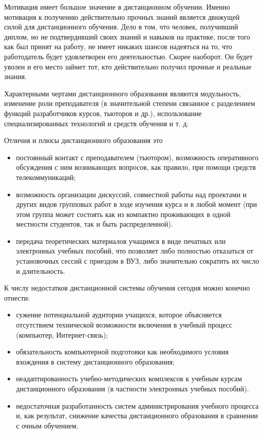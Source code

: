 Мотивация имеет большое значение в дистанционном обучении. Именно мотивация к получению действительно прочных знаний
является движущей силой для дистанционного обучения. Дело в том, что человек, получивший диплом,
но не подтвердивший своих знаний и навыков на практике, после того как был принят на работу,
не имеет никаких шансов надеяться на то, что работодатель будет удовлетворен его деятельностью.
Скорее наоборот. Он будет уволен и его место займет тот, кто действительно получил прочные и
реальные знания.

Характерными чертами дистанционного образования являются модульность, изменение роли
преподавателя (в значительной степени связанное с разделением функций разработчиков курсов,
тьюторов и др.), использование специализированных технологий и средств обучения и т. д.

Отличия и плюсы дистанционного образования это
\begin{itemize}[wide,topsep=0pt]
  \itemsep0em
  \item постоянный контакт с преподавателем (тьютором), возможность оперативного обсуждения с ним
  возникающих вопросов, как правило, при помощи средств телекоммуникаций;
  \item возможность организации дискуссий, совместной работы над проектами и других видов групповых
  работ в ходе изучения курса и в любой момент (при этом группа может состоять как
  из компактно проживающих в одной местности студентов, так и быть распределенной).
  \item передача теоретических материалов учащимся в виде печатных или электронных учебных пособий,
  что позволяет либо полностью отказаться от установочных сессий с приездом в ВУЗ, либо
  значительно сократить их число и длительность.
\end{itemize}

К числу недостатков дистанционной системы обучения сегодня можно конечно отнести:
\begin{itemize}[wide,topsep=0pt]
  \itemsep0em
  \item сужение потенциальной аудитории учащихся, которое объясняется отсутствием технической
  возможности включения в учебный процесс (компьютер, Интернет-связь);
  \item обязательность компьютерной подготовки как необходимого условия вхождения в систему
  дистанционного образования;
  \item неадаптированность учебно-методических комплексов к
  учебным курсам дистанционного образования (в частности электронных учебных пособий).
  \item недостаточная разработанность систем администрирования учебного процесса и, как результат,
  снижение качества дистанционного образования в сравнении с очным обучением.
\end{itemize}

